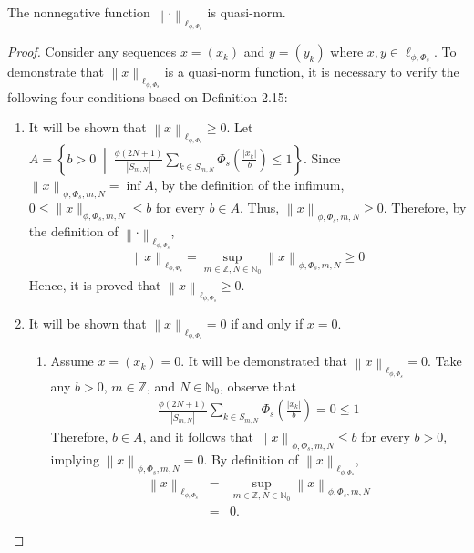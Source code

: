 \documentclass[10pt,a4paper]{amsart}
\begin{document}
\begin{theorem}
    The nonnegative function $\left\lVert \cdot \right\rVert _{\ell_{\phi,\Phi_s}}$ is quasi-norm.
\end{theorem}

\begin{proof}
    Consider any sequences $x=\left(x_k\right)$ and $y=\left(y_k\right)$ where $x, y \in \ell_{\phi, \Phi_s}$. To demonstrate that $\left\lVert x \right\rVert _{\ell_{\phi,\Phi_s}}$ is a quasi-norm function, it is necessary to verify the following four conditions based on Definition 2.15:

    \begin{enumerate}
        \item It will be shown that $\left\lVert x \right\rVert _{\ell_{\phi,\Phi_s}}\geq 0$.
        Let $A = \left\{b>0 \;\middle|\; \frac{\phi\left(2N+1\right)}{\left|S_{m,N}\right|}\sum_{k\in S_{m,N}}\Phi_s\left(\frac{\left|x_k\right|}{b}\right) \leq 1\right\}$. Since $\left\lVert x \right\rVert _{\phi, \Phi_s, m, N}=\inf A$, by the definition of the infimum, $0 \leq \|x\|_{\phi, \Phi_s, m, N} \leq b$ for every $b \in A$. Thus, $\left\lVert x \right\rVert _{\phi, \Phi_s, m, N}\geq 0$. Therefore, by the definition of $\left\lVert \cdot \right\rVert _{\ell_{\phi,\Phi_s}}$,
        \begin{eqnarray*}
            \left\lVert x \right\rVert _{\ell_{\phi,\Phi_s}}=\sup_{m \in \mathbb{Z}, N \in \mathbb{N}_0} \left\lVert x \right\rVert _{\phi, \Phi_s, m, N}\geq 0
        \end{eqnarray*}
        Hence, it is proved that $\left\lVert x \right\rVert _{\ell_{\phi,\Phi_s}}\geq 0$.
        
        \item It will be shown that $\left\lVert x \right\rVert _{\ell_{\phi,\Phi_s}}=0$ if and only if $x=0$.
        \begin{enumerate}
            \item [$(\Leftarrow)$] Assume $x = \left(x_k\right) = 0$. It will be demonstrated that $\left\lVert x \right\rVert _{\ell_{\phi,\Phi_s}}=0$. Take any $b>0$, $m \in \mathbb{Z}$, and $N \in \mathbb{N}_0$, observe that 
            \begin{eqnarray*}
                \frac{\phi\left(2N+1\right)}{\left|S_{m,N}\right|}\sum_{k\in S_{m,N}}\Phi_s\left(\frac{\left|x_k\right|}{b}\right)=0 \leq 1
            \end{eqnarray*}
            Therefore, $b \in A$, and it follows that $\left\lVert x \right\rVert _{\phi, \Phi_s, m, N}\leq b$ for every $b>0$, implying $\left\lVert x \right\rVert _{\phi, \Phi_s, m, N}=0$. By definition of $\left\lVert x \right\rVert _{\ell_{\phi,\Phi_s}}$,
            \begin{eqnarray*}
                \left\lVert x \right\rVert _{\ell_{\phi,\Phi_s}}&=&\sup_{m \in \mathbb{Z}, N \in \mathbb{N}_0} \left\lVert x \right\rVert _{\phi, \Phi_s, m, N}\\
                   &=&0.
            \end{eqnarray*}
               

\end{enumerate}
\end{enumerate}
\end{proof}
\end{document}
